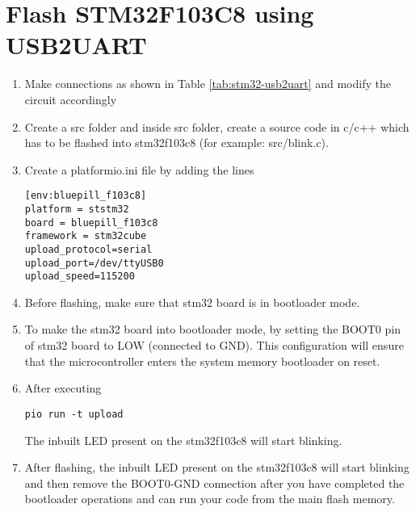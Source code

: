 \documentclass[12pt]{article}
\begin{document}
\section{Flash STM32F103C8 using USB2UART}

\renewcommand{\theequation}{\theenumi}
\renewcommand{\thefigure}{\theenumi}
\begin{enumerate}[label=\thesubsection.\arabic*.,ref=\thesubsection.\theenumi]
\item Make connections as shown in Table \ref{tab:stm32-usb2uart} and modify the circuit accordingly
			\begin{table}[!h]
			\centering
		
		\caption{}
		\label{tab:stm32-usb2uart}
	\end{table}
\item Create a src folder and inside src folder, create a source code in c/c++ which has to be flashed into stm32f103c8 (for example: src/blink.c).

\item Create a platformio.ini file by adding the lines
\begin{lstlisting}
[env:bluepill_f103c8]
platform = ststm32
board = bluepill_f103c8
framework = stm32cube
upload_protocol=serial
upload_port=/dev/ttyUSB0
upload_speed=115200
\end{lstlisting}

\item Before flashing, make sure that stm32 board is in bootloader mode.

\item To make the stm32 board into bootloader mode, by setting the BOOT0 pin of stm32 board to LOW (connected to GND). This configuration will ensure that the microcontroller enters the system memory bootloader on reset.

\item After executing 
\begin{lstlisting}
pio run -t upload
\end{lstlisting}
The inbuilt LED present on the stm32f103c8 will start blinking.

\item After flashing, the inbuilt LED present on the stm32f103c8 will start blinking and then remove the BOOT0-GND connection after you have completed the bootloader operations and can run your code from the main flash memory.
\end{enumerate}
\end{document}
